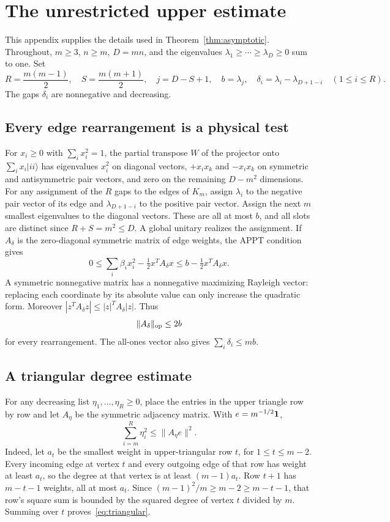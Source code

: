 \section{The unrestricted upper estimate}\label{app:sharp-upper}
This appendix supplies the details used in Theorem~\ref{thm:asymptotic}.
Throughout, $m\geq3$, $n\geq m$, $D=mn$, and the eigenvalues
$\lambda_1\geq\cdots\geq\lambda_D\geq0$ sum to one. Set
\[
 R=\frac{m(m-1)}2,\quad S=\frac{m(m+1)}2,\quad j=D-S+1,\quad
 b=\lambda_j,\quad \delta_i=\lambda_i-\lambda_{D+1-i}\quad(1\leq i\leq R).
\]
The gaps $\delta_i$ are nonnegative and decreasing.

\subsection{Every edge rearrangement is a physical test}
For $x_i\geq0$ with $\sum_i x_i^2=1$, the partial transpose $W$ of the
projector onto $\sum_i x_i|ii\rangle$ has eigenvalues $x_i^2$ on diagonal
vectors, $+x_ix_k$ and $-x_ix_k$ on symmetric and antisymmetric pair
vectors, and zero on the remaining $D-m^2$ dimensions. For any assignment
of the $R$ gaps to the edges of $K_m$, assign $\lambda_i$ to the negative
pair vector of its edge and $\lambda_{D+1-i}$ to the positive pair vector.
Assign the next $m$ smallest eigenvalues to the diagonal vectors. These
are all at most $b$, and all slots are distinct since $R+S=m^2\leq D$.
A global unitary realizes the assignment. If $A_\delta$ is the
zero-diagonal symmetric matrix of edge weights, the APPT condition gives
\[
 0\leq\sum_i\beta_i x_i^2-\tfrac12x^TA_\delta x
 \leq b-\tfrac12x^TA_\delta x.
\]
A symmetric nonnegative matrix has a nonnegative maximizing Rayleigh
vector: replacing each coordinate by its absolute value can only
increase the quadratic form. Moreover
$|z^TA_\delta z|\leq |z|^TA_\delta|z|$. Thus
\begin{equation}\label{eq:all-edge-norm}
 \|A_\delta\|_{\rm op}\leq2b
\end{equation}
for every rearrangement. The all-ones vector also gives
$\sum_i\delta_i\leq mb$.

\subsection{A triangular degree estimate}
For any decreasing list $\eta_1,\ldots,\eta_R\geq0$, place the entries in
the upper triangle row by row and let $A_\eta$ be the symmetric
adjacency matrix. With $e=m^{-1/2}{\bf1}$,
\begin{equation}\label{eq:triangular}
 \sum_{i=m}^{R}\eta_i^2\leq\|A_\eta e\|^2.
\end{equation}
Indeed, let $a_t$ be the smallest weight in upper-triangular row $t$,
for $1\leq t\leq m-2$. Every incoming edge at vertex $t$ and every
outgoing edge of that row has weight at least $a_t$, so the degree
at that vertex is at least $(m-1)a_t$. Row $t+1$ has $m-t-1$ weights,
all at most $a_t$. Since $(m-1)^2/m\geq m-2\geq m-t-1$, that row's
square sum is bounded by the squared degree of vertex $t$ divided
by $m$. Summing over $t$ proves~\eqref{eq:triangular}.

